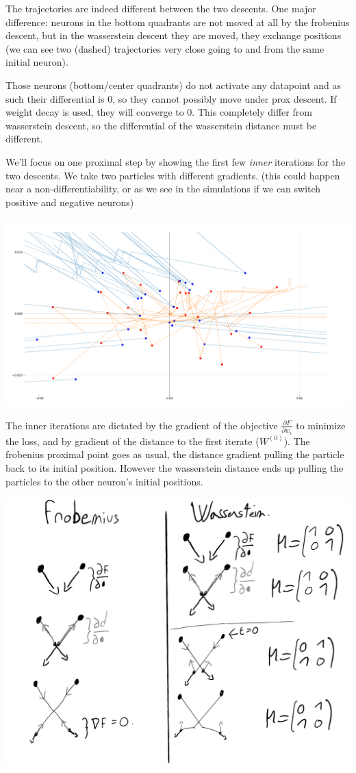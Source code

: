 The trajectories are indeed different between the two descents. One major difference: neurons in the bottom quadrants are not moved at all by the frobenius descent, but in the wasserstein descent they are moved, they exchange positions (we can see two (dashed) trajectories very close going to and from the same initial neuron).

Those neurons (bottom/center quadrants) do not activate any datapoint and as such their differential is 0, so they cannot possibly move under prox descent. If weight decay is used, they will converge to 0. This completely differ from wasserstein descent, so the differential of the wasserstein distance must be different.

We'll focus on one proximal step by showing the first few \emph{inner} iterations for the two descents. We take two particles with different gradients. (this could happen near a non-differentiability, or as we see in the simulations if we can switch positive and negative neurons)

\includegraphics[width=1.0\textwidth]{imgs/grand_pas_10steps_trajs.png}

The inner iterations are dictated by the gradient of the objective $\frac{\partial F}{\partial w_i}$ to minimize the loss, and by gradient of the distance to the first iterate ($W^{(0)}$). The frobenius proximal point goes as usual, the distance gradient pulling the particle back to its initial position. However the wasserstein distance ends up pulling the particles to the other neuron's initial positions.

\includegraphics[width=1.0\textwidth]{imgs/schema_one_prox_step.png}

